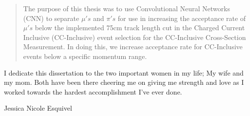 
\begin{abstract}%
The purpose of this thesis was to use Convolutional Neural Networks (CNN) to separate $\mu'{s}$ and $\pi'{s}$ for use in increasing the acceptance rate of $\mu'{s}$ below the implemented 75cm track length cut in the Charged Current Inclusive (CC-Inclusive) event selection for the CC-Inclusive Cross-Section Measurement. In doing this, we increase acceptance rate for CC-Inclusive events below a specific momentum range.
\end{abstract}

\begin{declaration}
  I dedicate this dissertation to the two important women in my life; My wife and my mom. Both have been there cheering me on giving me strength and love as I worked towards the hardest accomplishment I've ever done.  
  \vspace*{1cm}
  \begin{flushright}
    Jessica Nicole Esquivel 
  \end{flushright}
\end{declaration}



